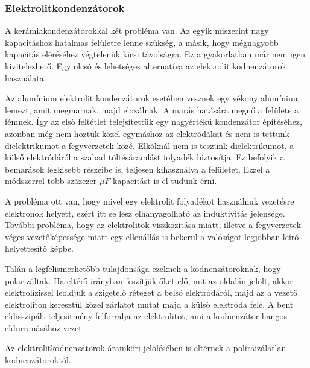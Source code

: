 \documentclass[12pt,a4paper]{article}
\begin{document}
\subsubsection{Elektrolitkondenzátorok}
A kerámiakondenzátorokkal két probléma van. Az egyik miszerint nagy kapacitáshoz hatalmas felületre lenne szükség, a másik, hogy mégnagyobb kapacitás eléréséhez végtelenük kicsi távolságra. Ez a gyakorlatban már nem igen kivitelezhető. Egy olcsó és lehetséges alternatíva az elektrolit kodnenzátorok használata.
\par Az alumínium elektrolit kondenzátorok esetében vesznek egy vékony alumínium lemezt, amit megmarnak, majd eloxálnak. A marás hatására megnő a felülete a fémnek. Így az első feltétlet telejsítettük egy nagyértékű kondenzátor építéséhez, azonban még nem hoztuk közel egymáshoz az elektródákat és nem is tettünk dielektrikumot a fegyverzetek közé. Elkóknál nem is teszünk dielektrikumot, a külső elektródáról a szabad töltésáramlást folyadék biztosítja. Ez befolyik a bemarások legkisebb részeibe is, teljesen kihasználva a felületet. Ezzel a módszerrel több százezer \( \mu F\) kapacitást is el tudunk érni. 
\par A probléma ott van, hogy mivel egy elektrolit folyadékot használnuk vezetésre elektronok helyett, ezért itt se lesz elhanyagolható az induktivitás jelensége. További probléma, hogy az elektrolitok viszkozitása miatt, illetve a fegyverzetek véges vezetőképessége miatt egy ellenállás is bekerül a valóságot legjobban leíró helyettesítő képbe.
\par Talán a legfelismerhetőbb tulajdonsága ezeknek a kodnenzátoroknak, hogy polarizáltak. Ha eltérő irányban feszítjük őket elő, mit az oldalán jelölt, akkor elektrolízissel leoldjuk a szigetelő réteget a belső elektródáról, majd az a vezető elektroliton keresztül közel zárlatot mutat majd a külső elektróda felé. A bent eldisszipált teljesítmény felforralja az elektrolitot, ami a kodnenzátor hangos eldurranásához vezet. 
\par
Az elektrolitkodnenzátorok áramköri jelölésében is eltérnek a poliraizálatlan kodnenzátoroktól.
\end{document}
